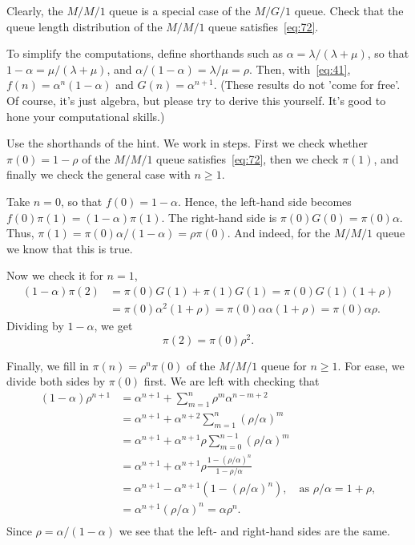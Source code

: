 \begin{exercise}
  Clearly, the $M/M/1$ queue is a special case of the $M/G/1$ queue.
  Check that the queue length distribution of the $M/M/1$ queue satisfies~\cref{eq:72}.
\begin{hint}
    To simplify the computations, define shorthands such as $\alpha=\lambda/(\lambda+\mu)$, so that $1-\alpha = \mu/(\lambda+\mu)$, and $\alpha/(1-\alpha) = \lambda /\mu = \rho$.
    Then, with~\cref{eq:41}, $f(n) = \alpha^n(1-\alpha)$ and $G(n) = \alpha^{n+1}$.
    (These results do not 'come for free'.
    Of course, it's just algebra, but please try to derive this yourself.
    It's good to hone your computational skills.)
\end{hint}
\begin{solution}
Use the shorthands of the hint. We work in steps. First we check whether $\pi(0)=1-\rho$ of the $M/M/1$ queue satisfies~\cref{eq:72}, then we check $\pi(1)$, and finally we check the general case with $n\geq 1$. 

Take $n=0$, so that $f(0)=1-\alpha$.  Hence, the left-hand side becomes $f(0) \pi(1) = (1-\alpha)\pi(1)$. The right-hand side is
      $\pi(0)G(0) = \pi(0)\alpha$. Thus,
      $\pi(1) = \pi(0)\alpha/(1-\alpha) = \rho \pi(0)$. And indeed, for the $M/M/1$ queue we know that this is true. 

Now we check it for $n=1$,
\begin{equation*}
  \begin{split}
  (1-\alpha)  \pi(2) 
&= \pi(0)G(1) + \pi(1)G(1) = \pi(0)G(1)(1+\rho) \\
&= \pi(0)\alpha^2(1+\rho) = \pi(0)\alpha \alpha (1+\rho) = \pi(0)\alpha \rho.
  \end{split}
\end{equation*}
Dividing by $1-\alpha$, we get
\begin{equation*}
  \pi(2) = \pi(0)\rho^2.
\end{equation*}

Finally, we fill in $\pi(n) = \rho^n \pi(0)$ of the $M/M/1$ queue for $n\geq 1$.
For ease, we divide both sides by $\pi(0)$ first.
We are left with checking that
\begin{align*}
    (1-\alpha)\rho^{n+1} 
&= \alpha^{n+1} + \sum_{m=1}^n \rho^m \alpha^{n-m+2}  \\
&= \alpha^{n+1} + \alpha^{n+2}\sum_{m=1}^n (\rho/\alpha)^m  \\
&= \alpha^{n+1} + \alpha^{n+1}\rho \sum_{m=0}^{n-1} (\rho/\alpha)^m \\
&= \alpha^{n+1} + \alpha^{n+1}\rho \frac{1-(\rho/\alpha)^n}{1-\rho/\alpha}\\
&= \alpha^{n+1} - \alpha^{n+1}(1-(\rho/\alpha)^n), \quad\text{as } \rho/\alpha = 1+\rho,\\
&= \alpha^{n+1}(\rho/\alpha)^n = \alpha \rho^n.\\
\end{align*}
Since $\rho=\alpha/(1-\alpha)$ we see that the left- and right-hand sides are the same. 


\end{solution}
\end{exercise}

